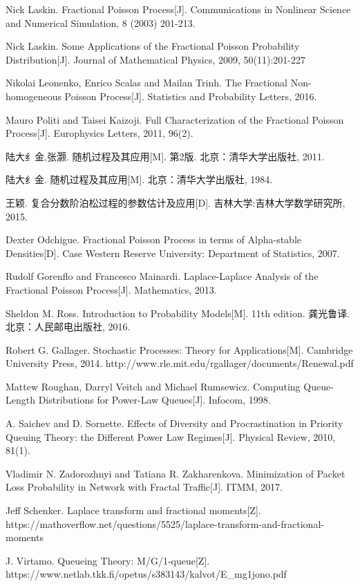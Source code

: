 \documentclass[a4paper, 12pt]{ctexart}
\begin{document}
\newpage
\begin{thebibliography}{1}
Nick Laskin. Fractional Poisson Process[J]. Communications in Nonlinear Science and Numerical Simulation, 8 (2003) 201-213.

Nick Laskin. Some Applications of the Fractional Poisson Probability Distribution[J]. Journal of Mathematical Physics, 2009, 50(11):201-227

Nikolai Leonenko, Enrico Scalas and Mailan Trinh. The Fractional Non-homogeneous Poisson Process[J]. Statistics and Probability Letters, 2016.

Mauro Politi and Taisei Kaizoji. Full Characterization of the Fractional Poisson Process[J]. Europhysics Letters, 2011, 96(2). 

陆大纟金,张灏. 随机过程及其应用[M]. 第2版. 北京：清华大学出版社, 2011.

陆大纟金. 随机过程及其应用[M]. 北京：清华大学出版社, 1984.

王颖. 复合分数阶泊松过程的参数估计及应用[D]. 吉林大学:吉林大学数学研究所, 2015.

Dexter Odchigue. Fractional Poisson Process in terms of Alpha-stable Densities[D]. Case Western Reserve University: Department of Statistics, 2007.

Rudolf Gorenflo and Francesco Mainardi. Laplace-Laplace Analysis of the Fractional Poisson Process[J]. Mathematics, 2013.

Sheldon M. Ross. Introduction to Probability Models[M]. 11th edition. 龚光鲁译. 北京：人民邮电出版社, 2016.

Robert G. Gallager. Stochastic Processes: Theory for Applications[M]. Cambridge University Press, 2014. http://www.rle.mit.edu/rgallager/documents/Renewal.pdf

Mattew Roughan, Darryl Veitch and Michael Rumsewicz. Computing Queue-Length Distributions for Power-Law Queues[J]. Infocom, 1998. 

A. Saichev and D. Sornette. Effects of Diversity and Procrastination in Priority Queuing Theory: the Different Power Law Regimes[J]. Physical Review, 2010, 81(1).

Vladimir N. Zadorozhnyi and Tatiana R. Zakharenkova. Minimization of Packet Loss Probability in Network with Fractal Traffic[J]. ITMM, 2017.

Jeff Schenker. Laplace transform and fractional moments[Z]. https://mathoverflow.net/questions/5525/laplace-transform-and-fractional-moments


J. Virtamo. Queueing Theory: M/G/1-queue[Z]. https://www.netlab.tkk.fi/opetus/s383143/kalvot/E\_mg1jono.pdf
\end{thebibliography}
\end{document}
